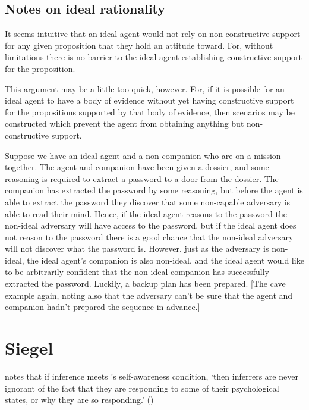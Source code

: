 \documentclass[10pt]{article}
\begin{document}
\subsection{Notes on ideal rationality}
\label{sec:notes-ideal-rati}

It seems intuitive that an ideal agent would not rely on non-constructive support for any given proposition that they hold an attitude toward.
For, without limitations there is no barrier to the ideal agent establishing constructive support for the proposition.

This argument may be a little too quick, however.
For, if it is possible for an ideal agent to have a body of evidence without yet having constructive support for the propositions supported by that body of evidence, then scenarios may be constructed which prevent the agent from obtaining anything but non-constructive support.

\begin{scenario}[Secrets]
  Suppose we have an ideal agent and a non-companion who are on a mission together.
  The agent and companion have been given a dossier, and some reasoning is required to extract a password to a door from the dossier.
  The companion has extracted the password by some reasoning, but before the agent is able to extract the password they discover that some non-capable adversary is able to read their mind.
  Hence, if the ideal agent reasons to the password the non-ideal adversary will have access to the password, but if the ideal agent does not reason to the password there is a good chance that the non-ideal adversary will not discover what the password is.
  However, just as the adversary is non-ideal, the ideal agent's companion is also non-ideal, and the ideal agent would like to be arbitrarily confident that the non-ideal companion has successfully extracted the password.
  Luckily, a backup plan has been prepared.
  [The cave example again, noting also that the adversary can't be sure that the agent and companion hadn't prepared the sequence in advance.]
\end{scenario}


\section{Siegel}
\label{sec:siegel}

\citeauthor{Siegel:2019aa} notes that if inference meets \citeauthor{Boghossian:2014aa}'s self-awareness condition, `then inferrers are never ignorant of the fact that they are responding to some of their psychological states, or why they are so responding.' (\citeyear[6]{Siegel:2019aa})
\end{document}
